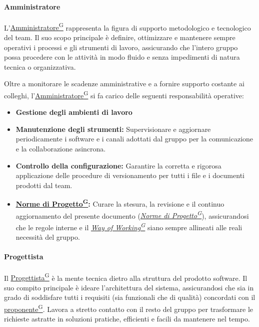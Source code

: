 \documentclass[a4paper,12pt]{article}
\providecommand{\glslink}[2]{\href{https://alittlebyte-19.github.io/Documentazione/glossario.html\#gls-#1}{\underline{#2}\textsuperscript{\scriptsize G}}}
\begin{document}
\paragraph{Amministratore}
L'\glslink{amministratore}{Amministratore} rappresenta la figura di supporto metodologico e tecnologico del team. Il suo scopo principale è definire, ottimizzare e mantenere sempre operativi i processi e gli strumenti di lavoro, assicurando che l'intero gruppo possa procedere con le attività in modo fluido e senza impedimenti di natura tecnica o organizzativa. 

Oltre a monitorare le scadenze amministrative e a fornire supporto costante ai colleghi, l'\glslink{amministratore}{Amministratore} si fa carico delle seguenti responsabilità operative:

\begin{itemize}
    \item \textbf{Gestione degli ambienti di lavoro}
    
    \item \textbf{Manutenzione degli strumenti:} Supervisionare e aggiornare periodicamente i software e i canali adottati dal gruppo per la comunicazione e la collaborazione asincrona.
    
    \item \textbf{Controllo della configurazione:} Garantire la corretta e rigorosa applicazione delle procedure di versionamento per tutti i file e i documenti prodotti dal team.
    
    \item \textbf{\glslink{norme-di-progetto}{Norme di Progetto}:} Curare la stesura, la revisione e il continuo aggiornamento del presente documento (\textit{\glslink{norme-di-progetto}{Norme di Progetto}}), assicurandosi che le regole interne e il \textit{\glslink{way-of-working-wow}{Way of Working}} siano sempre allineati alle reali necessità del gruppo.
\end{itemize}

\paragraph{Progettista}

Il \glslink{progettista}{Progettista} è la mente tecnica dietro alla struttura del prodotto software. Il suo compito principale è ideare l'architettura del sistema, assicurandosi che sia in grado di soddisfare tutti i requisiti (sia funzionali che di qualità) concordati con il \glslink{committente-proponente}{proponente}. Lavora a stretto contatto con il resto del gruppo per trasformare le richieste astratte in soluzioni pratiche, efficienti e facili da mantenere nel tempo.
\end{document}
